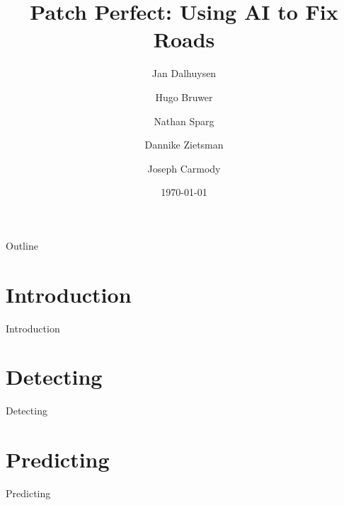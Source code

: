 \documentclass{beamer}
\title{Patch Perfect: Using AI to Fix Roads}
\author{Jan Dalhuysen \and Hugo Bruwer \and Nathan Sparg \and Dannike Zietsman \and Joseph Carmody}
\date{\today}
\begin{document}
\begin{frame}
    \titlepage 
\end{frame}

\logo{}


\begin{frame}{Outline}
    \tableofcontents
\end{frame}


\section{Introduction}
\begin{frame}{Introduction}

\end{frame}

\section{Detecting}
\begin{frame}{Detecting}

\end{frame}

\section{Predicting}
\begin{frame}{Predicting}

\end{frame}
\end{document}
